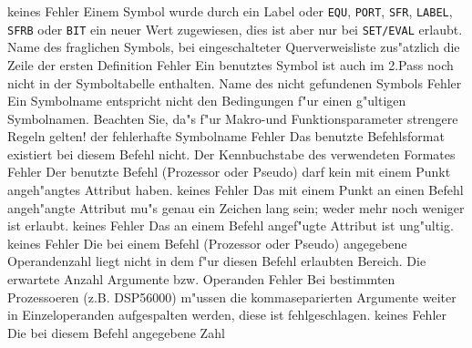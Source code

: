 \documentclass[12pt,a4paper,twoside]{report}
\newcommand{\tty}[1]{{\tt #1}}
\begin{document}
\begin{description}
               {keines}
               {Fehler}
               {Einem Symbol wurde durch ein Label oder
	        \tty{EQU}, \tty{PORT}, \tty{SFR}, \tty{LABEL},
	        \tty{SFRB} oder \tty{BIT} ein neuer  Wert zugewiesen, dies
                ist aber nur bei \tty{SET/EVAL} erlaubt.}
               {Name des fraglichen Symbols, bei eingeschalteter
	        Querverweisliste zus"atzlich die Zeile der ersten Definition}
               {Fehler}
               {Ein benutztes Symbol ist auch im 2.Pass noch
                nicht in der Symboltabelle enthalten.}
               {Name des nicht gefundenen Symbols}
               {Fehler}
               {Ein Symbolname entspricht nicht den Bedingungen
                f"ur einen g"ultigen Symbolnamen.  Beachten Sie, da"s f"ur
                Makro-und Funktionsparameter strengere Regeln gelten!}
               {der fehlerhafte Symbolname}
               {Fehler}
               {Das benutzte Befehlsformat existiert bei diesem
                Befehl nicht.}
               {Der Kennbuchstabe des verwendeten Formates}
               {Fehler}
               {Der benutzte Befehl (Prozessor oder Pseudo) darf
                kein mit einem Punkt angeh"angtes Attribut haben.}
               {keines}
               {Fehler}
               {Das mit einem Punkt an einen Befehl angeh"angte
                Attribut mu"s genau ein Zeichen lang sein; weder mehr noch
                weniger ist erlaubt.}
               {keines}
               {Fehler}
               {Das an einem Befehl angef"ugte Attribut ist ung"ultig.}
               {keines}
               {Fehler}
               {Die bei einem Befehl (Prozessor oder Pseudo)
                angegebene Operandenzahl liegt nicht in dem f"ur diesen
                Befehl erlaubten Bereich.}
               {Die erwartete Anzahl Argumente bzw. Operanden}
               {Fehler}
               {Bei bestimmten Prozessoeren (z.B. DSP56000)
                m"ussen die kommaseparierten Argumente weiter in
                Einzeloperanden aufgespalten werden, diese ist
                fehlgeschlagen.}
               {keines}
               {Fehler}
               {Die bei diesem Befehl angegebene Zahl
}
\end{description}
\end{document}
